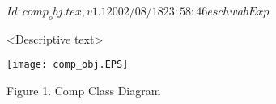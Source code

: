$Id: comp_obj.tex,v 1.1 2002/08/18 23:58:46 eschwab Exp $


<Descriptive text>

\begin{center}
\texttt{[image: comp\_obj.EPS]}
   
Figure 1.  Comp Class Diagram
   
\end{center}
